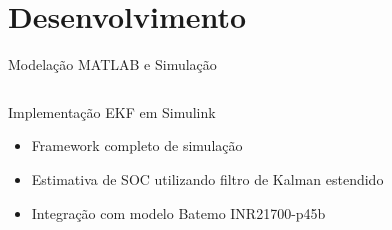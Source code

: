 \documentclass[aspectratio=169,xcolor=dvipsnames]{beamer}
\begin{document}
\section{Desenvolvimento}
\begin{frame}{Modelação MATLAB e Simulação}
  \begin{columns}
    \begin{column}{0.5\textwidth}
      \begin{block}{Implementação EKF em Simulink}
        \begin{itemize}
          \item Framework completo de simulação
          \item Estimativa de SOC utilizando filtro de Kalman estendido
          \item Integração com modelo Batemo INR21700-p45b
        \end{itemize}
      \end{block}
    \end{column}
    
    \begin{column}{0.5\textwidth}
      \centering
      \vspace{0.5cm}
    \end{column}
  \end{columns}
\end{frame}
\end{document}
